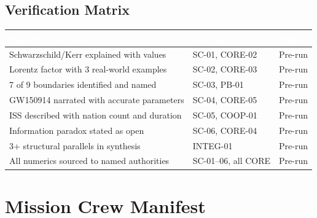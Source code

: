 \documentclass[11pt,letterpaper]{article}
\newcommand{\tableheader}[1]{\textbf{\sffamily\textcolor{white}{#1}}}
\begin{document}
\subsection{Verification Matrix}

\begin{center}
\begin{tabularx}{\textwidth}{L{5cm}L{3cm}C{2cm}}
\toprule
{}
\tableheader{Success Criterion} & \tableheader{Test IDs} & \tableheader{Status} \\
\midrule
Schwarzschild/Kerr explained with values & SC-01, CORE-02 & Pre-run \\
Lorentz factor with 3 real-world examples & SC-02, CORE-03 & Pre-run \\
7 of 9 boundaries identified and named & SC-03, PB-01 & Pre-run \\
GW150914 narrated with accurate parameters & SC-04, CORE-05 & Pre-run \\
ISS described with nation count and duration & SC-05, COOP-01 & Pre-run \\
Information paradox stated as open & SC-06, CORE-04 & Pre-run \\
3+ structural parallels in synthesis & INTEG-01 & Pre-run \\
All numerics sourced to named authorities & SC-01--06, all CORE & Pre-run \\
\bottomrule
\end{tabularx}
\end{center}

\section{Mission Crew Manifest}
\end{document}
